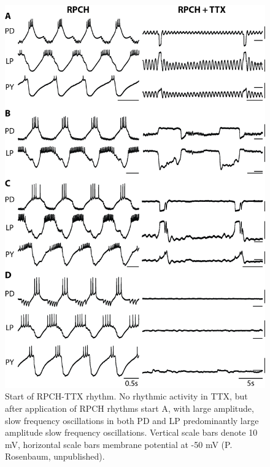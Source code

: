 \begin{figure}[h]
	\centering
	\includegraphics[width=1.0\linewidth]{gfx/RPCH_TTX_real_data}
	\caption[Long timescale oscillations in RPCH and TTX]{Start of \acs{RPCH}-\acs{TTX} rhythm. No rhythmic activity in \acs{TTX}, but after application of \acs{RPCH} rhythms start A, with large amplitude, slow frequency oscillations in both \acs{PD} and \acs{LP} predominantly large amplitude slow frequency oscillations. Vertical scale bars denote 10 mV, horizontal scale bars membrane potential at -50 mV (P. Rosenbaum, unpublished).}
	\label{fig:rpchttxrealdata}
\end{figure}

